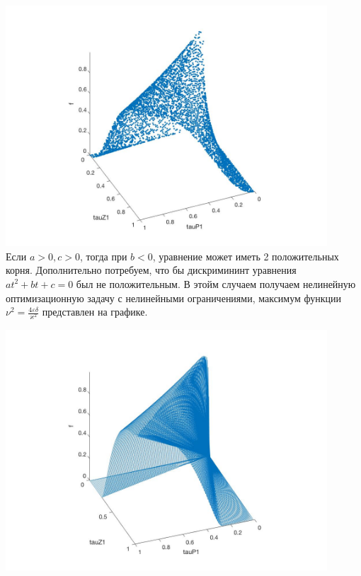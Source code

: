 \documentclass[a4paper]{article}
\begin{document}
\includegraphics[width=12cm]{images/filter2_tau0.jpg}\\

Если $a > 0, c > 0$, тогда  при $b < 0$, уравнение может иметь 2 положительных корня. Дополнительно потребуем, что бы дискримининт уравнения $at^2 + bt +c = 0$ был не положительным. В этойм случаем получаем нелинейную оптимизационную задачу с нелинейными ограничениями, максимум функции $\nu^2 = \frac{4\varepsilon\delta}{\varkappa^2}$ представлен на графике.

\includegraphics[width=12cm]{images/filter2_tau0_1.jpg}\\
\end{document}
